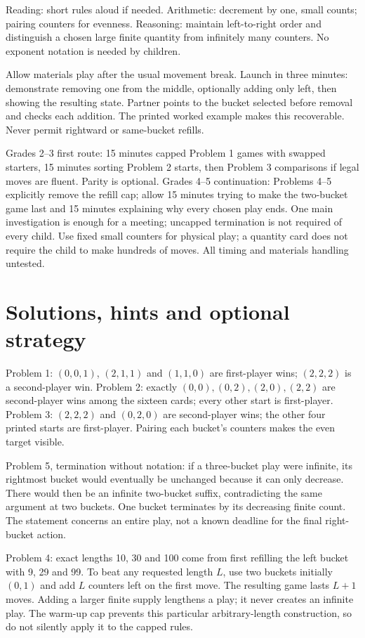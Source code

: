 \documentclass[11pt,letterpaper]{article}
\begin{document}
Reading: short rules aloud if needed. Arithmetic: decrement by one, small counts; pairing counters for evenness. Reasoning: maintain left-to-right order and distinguish a chosen large finite quantity from infinitely many counters. No exponent notation is needed by children.

Allow materials play after the usual movement break. Launch in three minutes: demonstrate removing one from the middle, optionally adding only left, then showing the resulting state. Partner points to the bucket selected before removal and checks each addition. The printed worked example makes this recoverable. Never permit rightward or same-bucket refills.

Grades 2--3 first route: 15 minutes capped Problem 1 games with swapped starters, 15 minutes sorting Problem 2 starts, then Problem 3 comparisons if legal moves are fluent. Parity is optional. Grades 4--5 continuation: Problems 4--5 explicitly remove the refill cap; allow 15 minutes trying to make the two-bucket game last and 15 minutes explaining why every chosen play ends. One main investigation is enough for a meeting; uncapped termination is not required of every child. Use fixed small counters for physical play; a quantity card does not require the child to make hundreds of moves. All timing and materials handling untested.
\newpage
\section*{Solutions, hints and optional strategy}
Problem 1: $(0,0,1)$, $(2,1,1)$ and $(1,1,0)$ are first-player wins; $(2,2,2)$ is a second-player win. Problem 2: exactly $(0,0),(0,2),(2,0),(2,2)$ are second-player wins among the sixteen cards; every other start is first-player. Problem 3: $(2,2,2)$ and $(0,2,0)$ are second-player wins; the other four printed starts are first-player. Pairing each bucket's counters makes the even target visible.

Problem 5, termination without notation: if a three-bucket play were infinite, its rightmost bucket would eventually be unchanged because it can only decrease. There would then be an infinite two-bucket suffix, contradicting the same argument at two buckets. One bucket terminates by its decreasing finite count. The statement concerns an entire play, not a known deadline for the final right-bucket action.

Problem 4: exact lengths 10, 30 and 100 come from first refilling the left bucket with 9, 29 and 99. To beat any requested length $L$, use two buckets initially $(0,1)$ and add $L$ counters left on the first move. The resulting game lasts $L+1$ moves. Adding a larger finite supply lengthens a play; it never creates an infinite play. The warm-up cap prevents this particular arbitrary-length construction, so do not silently apply it to the capped rules.
\end{document}
